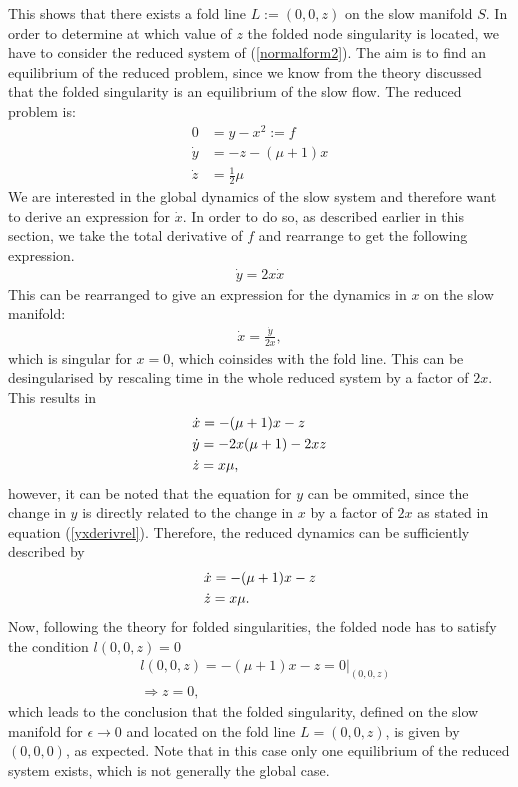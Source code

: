 This shows that there exists a fold line $L:=(0,0,z)$ on the slow manifold $S$.
In order to determine at which value of $z$ the folded node singularity is located, we have to consider the reduced system of (\ref{normalform2}). The aim is to find an equilibrium of the reduced problem, since we know from the theory discussed that the folded singularity is an equilibrium of the slow flow.
The reduced problem is:
\begin{align}\label{normalform2red}
0 &= y - x^2 :=f\\
\dot{y} &=- z -(\mu +1)x \\
\dot{z} &=\frac{1}{2} \mu
\end{align}
We are interested in the global dynamics of the slow system and therefore want to derive an expression for $\dot{x}$. In order to do so, as described earlier in this section, we take the total derivative of $f$ and rearrange to get the following expression.
\begin{align} \label{yxderivrel}
\dot{y} = 2x \dot{x}
\end{align}
 This can be rearranged to give an expression for the dynamics in $x$ on the slow manifold:
\begin{align*}
\dot{x}= \frac{\dot{y}}{2x},
\end{align*}
which is singular for $x=0$, which coinsides with the fold line.
This can be desingularised by rescaling time in the whole reduced system by a factor of $2x$. This results in
\begin{align} \label{fullredsysformmo}
&\dot{x} = -(\mu+1)x - z \notag \\
&\dot{y} = - 2x (\mu +1) -2xz\\
&\dot{z} = x \mu \notag,
\end{align}
however, it can be noted that the equation for $y$ can be ommited, since the change in $y$ is directly related to the change in $x$ by a factor of $2x$ as stated in equation (\ref{yxderivrel}). Therefore, the reduced dynamics can be sufficiently described by
\begin{align}\label{twovarxzred}
&\dot{x} = -(\mu+1)x - z\\
&\dot{z} = x \mu. \notag
\end{align}
Now, following the theory for folded singularities, the folded node has to satisfy the condition $l(0,0,z)=0$
\begin{align*}
&l(0,0,z)= -(\mu+1)x - z=0 |_{(0,0,z)}\\
&\Rightarrow z=0,
\end{align*}
which leads to the conclusion that the folded singularity, defined on the slow manifold for $\epsilon \to 0$ and located on the fold line $L=(0,0,z)$, is given by $(0,0,0)$, as expected. Note that in this case only one equilibrium of the reduced system exists, which is not generally the global case.

